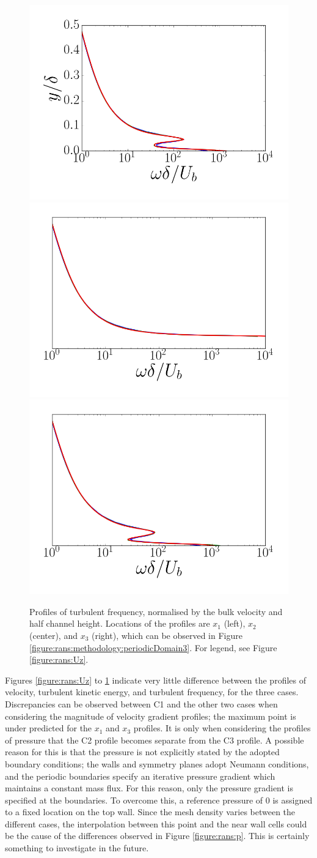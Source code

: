 \documentclass[12pt,oneside,a4paper]{article}
\begin{document}
\begin{figure}
\centering
\includegraphics[width=0.33\linewidth]{images/CFD_meshIndependence/X1_omega.png}\hfill \includegraphics[width=0.33\linewidth]{images/CFD_meshIndependence/X2_omega.png}\hfill
\includegraphics[width=0.33\linewidth]{images/CFD_meshIndependence/X3_omega.png}\hfill\caption{Profiles of turbulent frequency, normalised by the bulk velocity and half channel height. Locations of the profiles are $x_1$ (left), $x_2$ (center), and $x_3$ (right), which can be observed in Figure \ref{figure:rans:methodology:periodicDomain3}. For legend, see Figure \ref{figure:rans:Uz}.}
\label{figure:rans:omega}
\end{figure}
%
%
Figures \ref{figure:rans:Uz} to \ref{figure:rans:omega} indicate very little difference between the profiles of velocity, turbulent kinetic energy, and turbulent frequency, for the three cases. Discrepancies can be observed between C1 and the other two cases when considering the magnitude of velocity gradient profiles; the maximum point is under predicted for the $x_1$ and $x_3$ profiles. It is only when considering the profiles of pressure that the C2 profile becomes separate from the C3 profile. A possible reason for this is that the pressure is not explicitly stated by the adopted boundary conditions; the walls and symmetry planes adopt Neumann conditions, and the periodic boundaries specify an iterative pressure gradient which maintains a constant mass flux. For this reason, only the pressure gradient is specified at the boundaries. To overcome this, a reference pressure of $0$ is assigned to a fixed location on the top wall. Since the mesh density varies between the different cases, the interpolation between this point and the near wall cells could be the cause of the differences observed in Figure \ref{figure:rans:p}. This is certainly something to investigate in the future.
\end{document}
